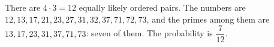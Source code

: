 There are $4\cdot3=12$ equally likely ordered pairs. The numbers are $12,13,17,21,23,27,31,32,37,71,72,73$, and the primes among them are $13,17,23,31,37,71,73$: seven of them. The probability is $\boxed{\dfrac{7}{12}}$.
